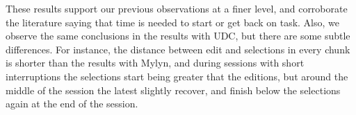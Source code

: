 \documentclass[times]{smrauth}
\begin{document}
These results support our previous observations at a finer level, and corroborate the literature saying that time is needed to start or get back on task. Also, we observe the same conclusions in the results with UDC, but there are some subtle differences. For instance, the distance between edit and selections in every chunk is shorter than the results with Mylyn, and during sessions with short interruptions the selections start being greater that the editions, but around the middle of the session the latest slightly recover, and finish below the selections again at the end of the session.


\end{document}
